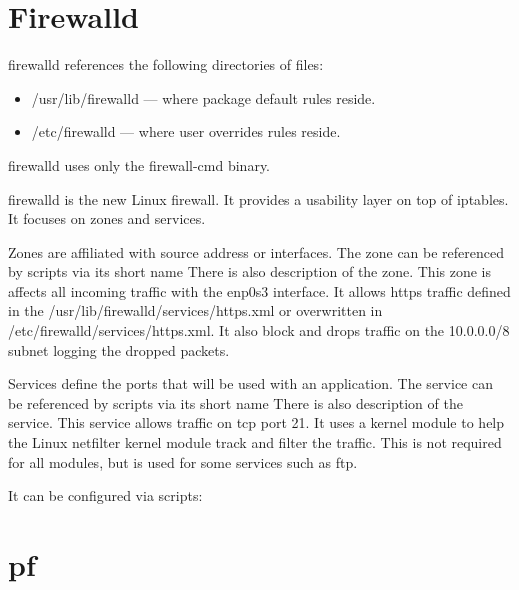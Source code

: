 
\section{Firewalld}
firewalld references the following directories of files:

\begin{itemize}
	\item /usr/lib/firewalld --- where package default rules reside.
	\item /etc/firewalld --- where user overrides rules reside.
\end{itemize}

firewalld uses only the firewall-cmd binary.\ 

firewalld is the new Linux firewall.
It provides a usability layer on top of iptables.
It focuses on zones and services.

Zones are affiliated with source address or interfaces.
The zone can be referenced by scripts via its short name
There is also description of the zone.
This zone is affects all incoming traffic with the enp0s3 interface.
It allows https traffic defined in the /usr/lib/firewalld/services/https.xml or overwritten in /etc/firewalld/services/https.xml.
It also block and drops traffic on the 10.0.0.0/8 subnet logging the dropped packets.


Services define the ports that will be used with an application.
The service can be referenced by scripts via its short name
There is also description of the service.
This service allows traffic on tcp port 21.
It uses a kernel module to help the Linux netfilter kernel module track and filter the traffic.
This is not required for all modules, but is used for some services such as ftp.

It can be configured via scripts:


\section{pf}

